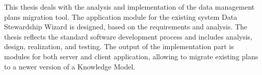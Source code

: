 This thesis deals with the analysis and implementation of the data management plans migration tool.
The application module for the existing system Data Stewardship Wizard is designed, based on the requirements and analysis.
The thesis reflects the standard software development process and includes analysis, design, realization, and testing.
The output of the implementation part is modules for both server and client application, allowing to migrate existing plans to a newer version of a Knowledge Model.
